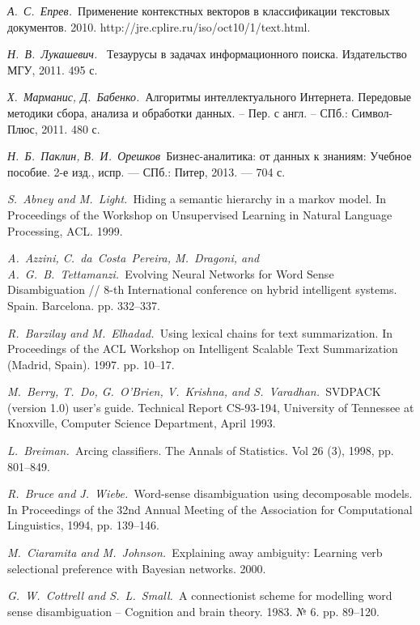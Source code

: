 \documentclass{article}
\begin{document}
\begin{articletext}
\begin{thebibliography}{9}
\textit{А.~С.~Епрев.~}Применение контекстных векторов в классификации текстовых документов. 2010. http://jre.cplire.ru/iso/oct10/1/text.html.

\textit{Н.~В.~Лукашевич.~} Тезаурусы в задачах информационного поиска. Издательство МГУ, 2011. 495 с.

\textit{Х.~Марманис, Д.~Бабенко.~}Алгоритмы интеллектуального Интернета. Передовые методики сбора, анализа и обработки данных. – Пер. с англ. – СПб.: Символ-Плюс, 2011. 480 с.

\textit{Н.~Б.~Паклин, В.~И.~Орешков~}Бизнес-аналитика: от данных к знаниям: Учебное пособие. 2-е изд., испр. --- СПб.: Питер, 2013. --- 704 с.

\textit{S.~Abney and M.~Light.~}Hiding a semantic hierarchy in a markov model. In Proceedings of the Workshop on Unsupervised Learning in Natural Language Processing, ACL. 1999.

\textit{A.~Azzini, C.~da~Costa~Pereira, M.~Dragoni, and A.~G.~B.~Tettamanzi.~}Evolving Neural Networks for Word Sense Disambiguation // 8-th International conference on hybrid intelligent systems. Spain. Barcelona. pp. 332–337.

\textit{R.~Barzilay and M.~Elhadad.~}Using lexical chains for text summarization. In Proceedings of the ACL Workshop on Intelligent Scalable Text Summarization (Madrid, Spain). 1997. pp. 10–17.

\textit{M.~Berry, T.~Do, G.~O’Brien, V.~Krishna, and S.~Varadhan.~}SVDPACK (version 1.0) user’s guide. Technical Report CS-93-194, University of Tennessee at Knoxville, Computer Science Department, April 1993.

\textit{L.~Breiman.~}Arcing classifiers. The Annals of Statistics. Vol 26 (3), 1998, pp. 801–849.

\textit{R.~Bruce and J.~Wiebe.~}Word-sense disambiguation using decomposable models. In Proceedings of the 32nd Annual Meeting of the Association for Computational Linguistics, 1994, pp. 139–146.

\textit{M.~Ciaramita and M.~Johnson.~}Explaining away ambiguity: Learning verb selectional preference with Bayesian networks. 2000. 

\textit{G.~W.~Cottrell and S.~L.~Small.~}A connectionist  scheme for modelling word  sense  disambiguation -- Cognition and brain theory. 1983. № 6. pp. 89–120. 


\end{thebibliography}
\end{articletext}
\end{document}
